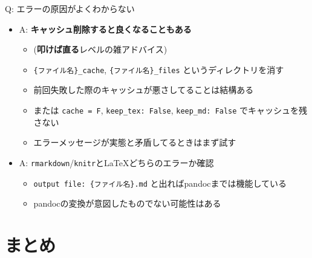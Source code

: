 \documentclass[
  12pt,
  ignorenonframetext,
]{beamer}
\providecommand{\tightlist}{%
  \setlength{\itemsep}{0pt}\setlength{\parskip}{0pt}}
\begin{document}
\begin{frame}[fragile]{Q: エラーの原因がよくわからない}
\protect\hypertarget{q-ux30a8ux30e9ux30fcux306eux539fux56e0ux304cux3088ux304fux308fux304bux3089ux306aux3044}{}

\begin{itemize}
\tightlist
\item
  A: \textbf{キャッシュ削除すると良くなることもある}

  \begin{itemize}
  \tightlist
  \item
    (\textbf{叩けば直る}レベルの雑アドバイス)
  \item
    \texttt{\{ファイル名\}\_cache}, \texttt{\{ファイル名\}\_files}
    というディレクトリを消す
  \item
    前回失敗した際のキャッシュが悪さしてることは結構ある
  \item
    または \texttt{cache\ =\ F}, \texttt{keep\_tex:\ False},
    \texttt{keep\_md:\ False} でキャッシュを残さない
  \item
    エラーメッセージが実態と矛盾してるときはまず試す
  \end{itemize}
\item
  A: \texttt{rmarkdown}/\texttt{knitr}と\LaTeX どちらのエラーか確認

  \begin{itemize}
  \tightlist
  \item
    \texttt{output\ file:\ \{ファイル名\}.md}
    と出ればpandocまでは機能している
  \item
    pandocの変換が意図したものでない可能性はある
  \end{itemize}
\end{itemize}

\end{frame}

\hypertarget{ux307eux3068ux3081}{%
\section{まとめ}\label{ux307eux3068ux3081}}
\end{document}
